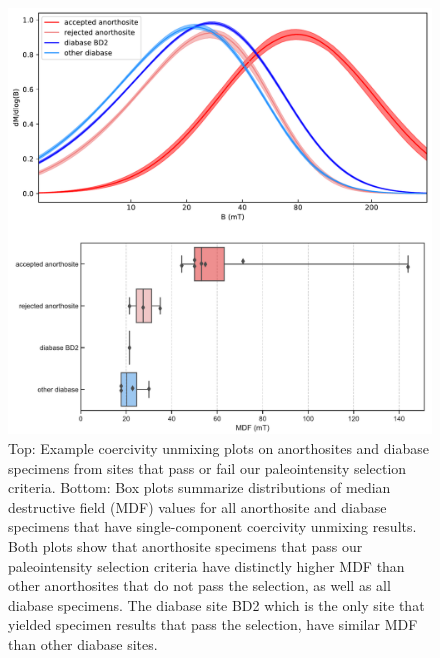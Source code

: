\documentclass[draft]{agujournal2019}
\begin{document}
\begin{figure}[h!]
\noindent\includegraphics[width=\textwidth]{coercivity.pdf}
\centering
\caption{\footnotesize{Top: Example coercivity unmixing plots on anorthosites and diabase specimens from sites that pass or fail our paleointensity selection criteria. Bottom: Box plots summarize distributions of median destructive field (MDF) values for all anorthosite and diabase specimens that have single-component coercivity unmixing results. Both plots show that anorthosite specimens that pass our paleointensity selection criteria have distinctly higher MDF than other anorthosites that do not pass the selection, as well as all diabase specimens. The diabase site BD2 which is the only site that yielded specimen results that pass the selection, have similar MDF than other diabase sites.}}
\label{fig:coercivity}
\end{figure}
\end{document}
